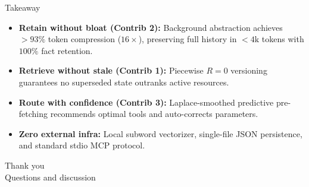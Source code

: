 \documentclass[aspectratio=169,10pt]{beamer}
\begin{document}

\begin{frame}{Takeaway}
  \begin{itemize}
    \item \textbf{Retain without bloat (Contrib 2):} Background abstraction achieves $>93\%$ token compression ($16\times$), preserving full history in $<4\mathrm{k}$ tokens with $100\%$ fact retention.
    \item \textbf{Retrieve without stale (Contrib 1):} Piecewise $R=0$ versioning guarantees no superseded state outranks active resources.
    \item \textbf{Route with confidence (Contrib 3):} Laplace-smoothed predictive pre-fetching recommends optimal tools and auto-corrects parameters.
    \item \textbf{Zero external infra:} Local subword vectorizer, single-file JSON persistence, and standard stdio MCP protocol.
  \end{itemize}
  \vspace{1.2em}
  \centering
  {\Large Thank you}\\[2pt]
  {\small Questions and discussion}
\end{frame}
\end{document}
